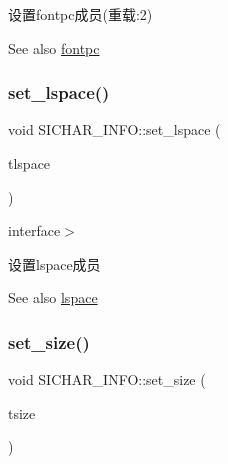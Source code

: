 设置fontpc成员(重载\+:2) 

\begin{DoxySeeAlso}{See also}
\hyperlink{class_s_i_c_h_a_r___i_n_f_o_a8d998c494943882d98981f79f620460d}{fontpc} 
\end{DoxySeeAlso}
\mbox{\label{class_s_i_c_h_a_r___i_n_f_o_af38e1eac74e8d9c14e5c5d05d58f8b36}} 
\subsubsection{\texorpdfstring{set\+\_\+lspace()}{set\_lspace()}}
{\footnotesize\ttfamily void S\+I\+C\+H\+A\+R\+\_\+\+I\+N\+F\+O\+::set\+\_\+lspace (\begin{DoxyParamCaption}\item[{L\+I\+N\+E\+S\+P\+A\+CE}]{tlspace }\end{DoxyParamCaption})\hspace{0.3cm}{\ttfamily [inline]}}



interface$>$ 

设置lspace成员 \begin{DoxySeeAlso}{See also}
\hyperlink{class_s_i_c_h_a_r___i_n_f_o_ace4bad34a55f914a2fbbdeb8f9a22bae}{lspace} 
\end{DoxySeeAlso}
\mbox{\label{class_s_i_c_h_a_r___i_n_f_o_afe883164593a8d3a5c9377eb5454c9f1}} 
\subsubsection{\texorpdfstring{set\+\_\+size()}{set\_size()}}
{\footnotesize\ttfamily void S\+I\+C\+H\+A\+R\+\_\+\+I\+N\+F\+O\+::set\+\_\+size (\begin{DoxyParamCaption}\item[{C\+H\+A\+R\+S\+I\+ZE}]{tsize }\end{DoxyParamCaption})\hspace{0.3cm}{\ttfamily [inline]}}



